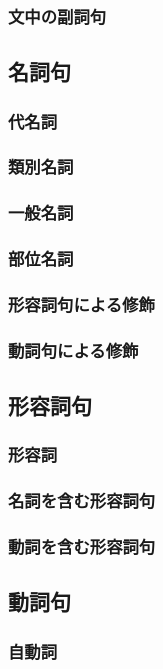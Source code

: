 \subsubsection{文中の副詞句}
\subsection{名詞句}
\subsubsection{代名詞}
\subsubsection{類別名詞}
\subsubsection{一般名詞}
\subsubsection{部位名詞}
\subsubsection{形容詞句による修飾}
\subsubsection{動詞句による修飾}
\subsection{形容詞句}
\subsubsection{形容詞}
\subsubsection{名詞を含む形容詞句}
\subsubsection{動詞を含む形容詞句}
\subsection{動詞句}
\subsubsection{自動詞}

